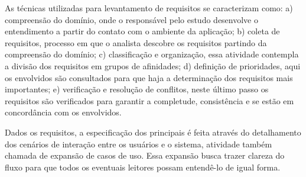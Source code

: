 As técnicas utilizadas para levantamento de requisitos se caracterizam como: a) compreensão do domínio, onde o responsável pelo estudo desenvolve o entendimento a partir do contato com o ambiente da aplicação; b) coleta de requisitos, processo em que o analista descobre os requisitos partindo da compreensão do domínio; c) classificação e organização, essa atividade contempla a divisão dos requisitos em grupos de afinidades; d) definição de prioridades, aqui os envolvidos são consultados para que haja a determinação dos requisitos mais importantes; e) verificação e resolução de conflitos, neste último passo os requisitos são verificados para garantir a completude, consistência e se estão em concordância com os envolvidos.

Dados os requisitos, a especificação dos principais é feita através do detalhamento dos cenários de interação entre os usuários e o sistema, atividade também chamada de expansão de casos de uso. Essa expansão busca trazer clareza do fluxo para que todos os eventuais leitores possam entendê-lo de igual forma.

%
